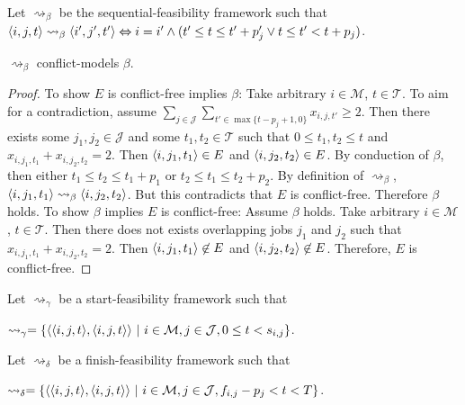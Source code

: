 \begin{definition}
	\label{intervalbeta}
	
	Let $\rightsquigarrow_\beta$ be the sequential-feasibility framework such that $\langle{i},{j},{t}\rangle\rightsquigarrow_\beta\langle{i'},{j'},{t'}\rangle\Leftrightarrow i=i'\land(t'\leq t\leq t'+p_j'\lor t\leq t'<t+p_j)$.
\end{definition}

\begin{lemma}
	\label{conflictfreenessbeta}
	$\rightsquigarrow_\beta$ conflict-models $\beta$.
	
	\begin{proof}
		To show $E$ is conflict-free implies $\beta$: Take arbitrary $i\in\mathcal{M}$, $t\in\mathcal{T}$. To aim for a contradiction, assume $\sum_{j\in\mathcal{J}}\sum_{t'\in\max\{t-p_j+1,0\}}x_{i,j,t'}\geq 2$. Then there exists some $j_1,j_2\in\mathcal{J}$ and some $t_1,t_2\in\mathcal{T}$ such that $0\leq t_1,t_2\leq t$ and $x_{i,j_1,t_1}+x_{i,j_2,t_2}=2$. Then $\langle{i},{j_1},{t_1}\rangle\in E$ and $\langle{i},{j_2},{t_2}\rangle\in E$. By conduction of $\beta$, then either $t_1\leq t_2\leq t_1+p_1$ or $t_2\leq t_1\leq t_2+p_2$. By definition of $\rightsquigarrow_\beta$, $\langle{i},{j_1},{t_1}\rangle\rightsquigarrow_\beta\langle{i},{j_2},{t_2}\rangle$. But this contradicts that $E$ is conflict-free. Therefore $\beta$ holds.
		\linespace
		To show $\beta$ implies $E$ is conflict-free: Assume $\beta$ holds. Take arbitrary $i\in\mathcal{M}$, $t\in\mathcal{T}$. Then there does not exists overlapping jobs $j_1$ and $j_2$ such that $x_{i,j_1,t_1}+x_{i,j_2,t_2}=2$. Then $\langle{i},{j_1},{t_1}\rangle\not\in E$ and $\langle{i},{j_2},{t_2}\rangle\not\in E$. Therefore, $E$ is conflict-free.
	\end{proof}
\end{lemma}

\begin{definition}
	\label{intervalgamma}
	
	Let $\rightsquigarrow_\gamma$ be a start-feasibility framework such that
	
	$\rightsquigarrow_\gamma=\{\pair{\triple{i}{j}{t}}{\triple{i}{j}{t}}\ |\ i\in\mathcal{M},j\in\mathcal{J},0\leq t<s_{i,j}\}$.
\end{definition}

\begin{definition}
	\label{intervaldelta}
	Let $\rightsquigarrow_\delta$ be a finish-feasibility framework such that
	
	$\rightsquigarrow_\delta=\{\pair{\triple{i}{j}{t}}{\triple{i}{j}{t}}\ |\ i\in\mathcal{M},j\in\mathcal{J},f_{i,j}-p_j<t<T\}$.
\end{definition}


